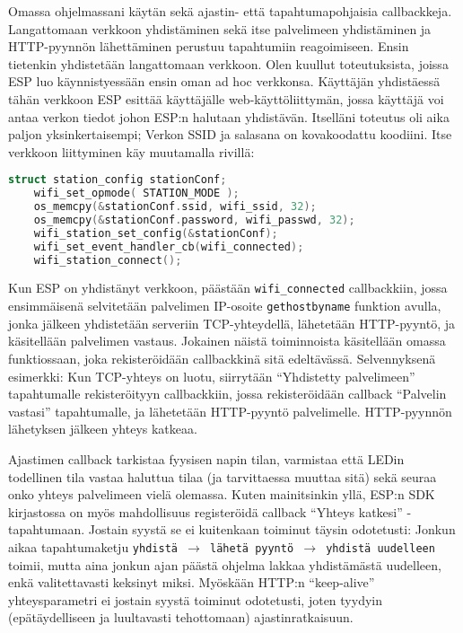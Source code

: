 Omassa ohjelmassani käytän sekä ajastin- että tapahtumapohjaisia callbackkeja.
Langattomaan verkkoon yhdistäminen sekä itse palvelimeen yhdistäminen ja
HTTP-pyynnön lähettäminen perustuu tapahtumiin reagoimiseen. Ensin tietenkin
yhdistetään langattomaan verkkoon. Olen kuullut toteutuksista, joissa ESP luo
käynnistyessään ensin oman ad hoc verkkonsa. Käyttäjän yhdistäessä tähän
verkkoon ESP esittää käyttäjälle web-käyttöliittymän, jossa käyttäjä voi antaa
verkon tiedot johon ESP:n halutaan yhdistävän. Itselläni toteutus oli aika
paljon yksinkertaisempi; Verkon SSID ja salasana on kovakoodattu koodiini.
Itse verkkoon liittyminen käy muutamalla rivillä:
\begin{lstlisting}[language=C]
    struct station_config stationConf;
    wifi_set_opmode( STATION_MODE );
    os_memcpy(&stationConf.ssid, wifi_ssid, 32);
    os_memcpy(&stationConf.password, wifi_passwd, 32);
    wifi_station_set_config(&stationConf);
    wifi_set_event_handler_cb(wifi_connected);
    wifi_station_connect();
\end{lstlisting}
Kun ESP on yhdistänyt verkkoon, päästään \texttt{wifi\_connected} callbackkiin,
jossa ensimmäisenä selvitetään palvelimen IP-osoite \texttt{gethostbyname}
funktion avulla, jonka jälkeen yhdistetään serveriin TCP-yhteydellä, lähetetään
HTTP-pyyntö, ja käsitellään palvelimen vastaus. Jokainen näistä toiminnoista
käsitellään omassa funktiossaan, joka rekisteröidään callbackkinä sitä
edeltävässä. Selvennyksenä esimerkki: Kun TCP-yhteys on luotu, siirrytään
``Yhdistetty palvelimeen'' tapahtumalle rekisteröityyn callbackkiin, jossa
rekisteröidään callback ``Palvelin vastasi'' tapahtumalle, ja lähetetään
HTTP-pyyntö palvelimelle. HTTP-pyynnön lähetyksen jälkeen yhteys katkeaa.

Ajastimen callback tarkistaa fyysisen napin tilan, varmistaa että LEDin
todellinen tila vastaa haluttua tilaa (ja tarvittaessa muuttaa sitä) sekä
seuraa onko yhteys palvelimeen vielä olemassa. Kuten mainitsinkin yllä, ESP:n
SDK kirjastossa on myös mahdollisuus registeröidä callback ``Yhteys katkesi''
-tapahtumaan. Jostain syystä se ei kuitenkaan toiminut täysin odotetusti:
Jonkun aikaa tapahtumaketju \texttt{yhdistä \(\rightarrow{}\) lähetä pyyntö
\(\rightarrow{}\) yhdistä uudelleen} toimii, mutta aina jonkun ajan päästä
ohjelma lakkaa yhdistämästä uudelleen, enkä valitettavasti keksinyt miksi.
Myöskään HTTP:n ``keep-alive'' yhteysparametri ei jostain syystä toiminut
odotetusti, joten tyydyin (epätäydelliseen ja luultavasti tehottomaan)
ajastinratkaisuun.

